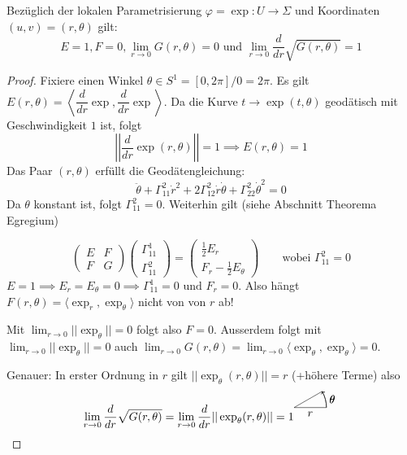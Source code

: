 \documentclass[../main.tex]{subfiles}
\begin{document}
\begin{proposition}
    Bezüglich der lokalen Parametrisierung $\varphi = \exp : U \to \Sigma$
    und Koordinaten $(u,v) = (r, \theta)$ gilt: $$E=1, F=0,\lim_{r \to 0} G(r,\theta)=0
    \text{ und } \lim_{r \to 0} \frac{d}{dr}\sqrt{G(r,\theta)} = 1$$

\end{proposition}

\begin{proof}
    Fixiere einen Winkel $\theta \in S^1 = [0,2\pi] / 0 = 2\pi$.
    Es gilt $E(r,\theta) = \left \langle \dfrac{d}{dr} \exp, \dfrac{d}{dr}\exp \right \rangle$.
    Da die Kurve $ t \to \exp (t, \theta)$ geodätisch mit Geschwindigkeit $1$ ist,
    folgt $$\left|\left| \frac{d}{dr}\exp (r, \theta)\right|\right| = 1 \implies E(r,\theta)=1$$
    Das Paar $(r, \theta)$ erfüllt die Geodätengleichung:
    $$
        \ddot{\theta} + \Gamma^2_{11}\dot{r}^2 + 2 \Gamma^2_{12}\dot{r}\dot{\theta} + \Gamma^2_{22}\dot{\theta}^2 = 0 
    $$
    Da $\theta$ konstant ist, folgt $\Gamma^2_{11}=0$. Weiterhin gilt (siehe Abschnitt Theorema Egregium)

    $$
    \begin{pmatrix}
        E & F \\ F & G
    \end{pmatrix}
    \begin{pmatrix}
        \Gamma^1_{11} \\ \Gamma^2_{11} %
    \end{pmatrix} = 
    \begin{pmatrix}
        \frac{1}{2}E_r \\ F_r - \frac{1}{2}E_{\theta}
    \end{pmatrix} \qquad \text{wobei }\Gamma^2_{11}=0
    $$$ E = 1 \implies E_r = E_{\theta} = 0 \implies \Gamma^1_{11}=0 \text{ und } F_r =0$.
    Also hängt $F(r,\theta) = \langle \exp _r, \exp _{\theta} \rangle$
    nicht von von $r$ ab!

    Mit $\lim_{r \to 0} ||\exp _{\theta} || = 0 $ folgt also $F = 0$.    
    Ausserdem folgt mit $\lim_{r \to 0} ||\exp _{\theta}|| = 0$ auch 
    $\lim_{r \to 0} G(r,\theta) = \lim_{r \to 0} \langle \exp _{\theta}, \exp _{\theta} \rangle = 0$.

    Genauer: In erster Ordnung in $r$ gilt $||\exp_{\theta}(r,\theta)|| = r$ (+höhere Terme)
    also $$\lim_{r \to 0} \frac{d}{dr}\sqrt{G(r,\theta)} = \lim_{r \to 0} \frac{d}{dr} ||\exp_{\theta}(r,\theta)|| =1
    \begin{tikzpicture}
        \draw (0,0) -- (1,0)
            node[midway, below] {$r$};
        \draw (0,0) -- (0.866,0.5);
        \draw[->] (1,0) arc (0:30:1 and 1)
            node[midway, right] {$\theta$};
            \draw[->] (1,0) arc (0:30:1 and 1)
            node[midway, right] {$\theta$};
    \end{tikzpicture}$$
\end{proof}
\end{document}
